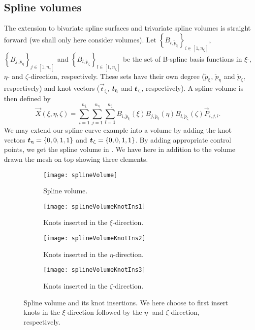 \subsection{Spline volumes}
\label{Sec:splineVolumes}
\renewcommand{\Xi}{{\vec{t}_\upxi}}
The extension to bivariate spline surfaces and trivariate spline volumes is straight forward (we shall only here consider volumes). Let $\left\{B_{i,\check{p}_\upxi}\right\}_{i\in[1,n_\upxi]}$, $\left\{B_{j,\check{p}_\upeta}\right\}_{j\in[1,n_\upeta]}$ and $\left\{B_{l,\check{p}_\upzeta}\right\}_{l\in[1,n_\upzeta]}$ be the set of B-spline basis functions in $\xi$-, $\eta$- and $\zeta$-direction, respectively. These sets have their own degree ($\check{p}_\upxi$, $\check{p}_\upeta$ and $\check{p}_\upzeta$, respectively) and knot vectors ($\Xi$, $\Eta$ and $\Zeta$, respectively). A spline volume is then defined by
\begin{equation*}
	\vec{X}(\xi,\eta,\zeta) = \sum_{i=1}^{n_\upxi}\sum_{j=1}^{n_\upeta}\sum_{l=1}^{n_\upzeta} B_{i,\check{p}_\upxi}(\xi)B_{j,\check{p}_\upeta}(\eta)B_{l,\check{p}_\upzeta}(\zeta)\vec{P}_{i,j,l}.
\end{equation*}
We may extend our spline curve example into a volume by adding the knot vectors $\Eta = \{0, 0, 1, 1\}$ and $\Zeta = \{0, 0, 1, 1\}$. By adding appropriate control points, we get the spline volume in . We have here in addition to the volume drawn the mesh on top showing three elements. 
\begin{figure}
	\centering        
	\begin{subfigure}{0.49\textwidth}
		\centering     
		\texttt{[image: splineVolume]}
		\caption{Spline volume.}
	\end{subfigure}%
    \hspace*{0.02\textwidth}%
	\begin{subfigure}{0.49\textwidth}
		\centering     
		\texttt{[image: splineVolumeKnotIns1]}
		\caption{Knots inserted in the $\xi$-direction.}
	\end{subfigure}
	\bigskip\par
	\bigskip\par
	\begin{subfigure}{0.49\textwidth}
		\centering     
		\texttt{[image: splineVolumeKnotIns2]}
		\caption{Knots inserted in the $\eta$-direction.}
	\end{subfigure}%
    \hspace*{0.02\textwidth}%
	\begin{subfigure}{0.49\textwidth}
		\centering     
		\texttt{[image: splineVolumeKnotIns3]}
		\caption{Knots inserted in the $\zeta$-direction.}
	\end{subfigure}
	\caption[Spline volume and its knot insertions]{Spline volume and its knot insertions. We here choose to first insert knots in the $\xi$-direction followed by the $\eta$- and $\zeta$-direction, respectively.}
	\label{Fig:SplineVolume}
\end{figure}

